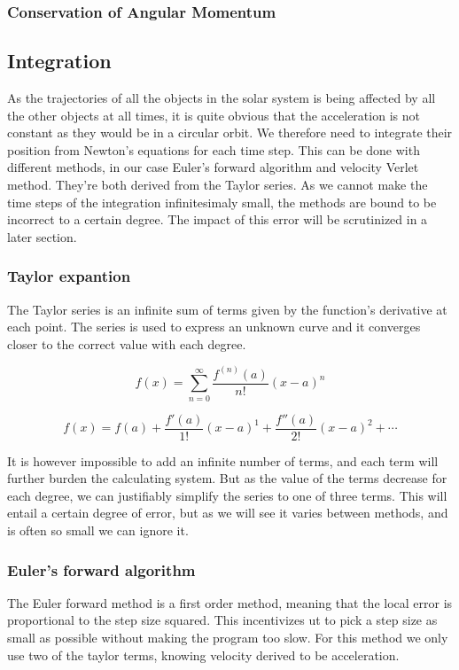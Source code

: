 \documentclass[10pt]{article}
\begin{document}
\begin{multicols}{2}
\subsubsection{Conservation of Angular Momentum}



\subsection{Integration}
As the trajectories of all the objects in the solar system is being
affected by all the other objects at all times, it is quite obvious that
the acceleration is not constant as they would be in a circular orbit. We
therefore need to integrate their position from Newton's equations for each
time step. This can be done with different methods, in our case Euler's
forward algorithm and velocity Verlet method. They're both derived from the
Taylor series. As we cannot make the time steps of the integration
infinitesimaly small, the methods are bound to be incorrect to a certain
degree. The impact of this error will be scrutinized in a later section.

\subsubsection{Taylor expantion}
The Taylor series is an infinite sum of terms given by the function's
derivative at each point. The series is used to express an unknown
curve and it converges closer to the correct value with each degree. 

\begin{equation}
   f(x) =  \sum_{n=0}^\infty\frac{f^{(n)}(a)}{n!}(x-a)^n
\end{equation}

\begin{equation}
    f(x) = f(a)+ \frac{f'(a)}{1!}(x-a)^1+\frac{f''(a)}{2!}(x-a)^2+\cdots
\end{equation}

It is however impossible to add an infinite number of terms, and each term
will further burden the calculating system. But as the value of the terms
decrease for each degree, we can justifiably simplify the series to one of
three terms. This will entail a certain degree of error, but as we will see
it varies between methods, and is often so small we can ignore it.

\subsubsection{Euler's forward algorithm}
The Euler forward method is a first order method, meaning that the local
error is proportional to the step size squared. This incentivizes ut to
pick a step size as small as possible without making the program too slow.
For this method we only use two of the taylor terms, knowing velocity
derived to be acceleration.  


\end{multicols}
\end{document}
